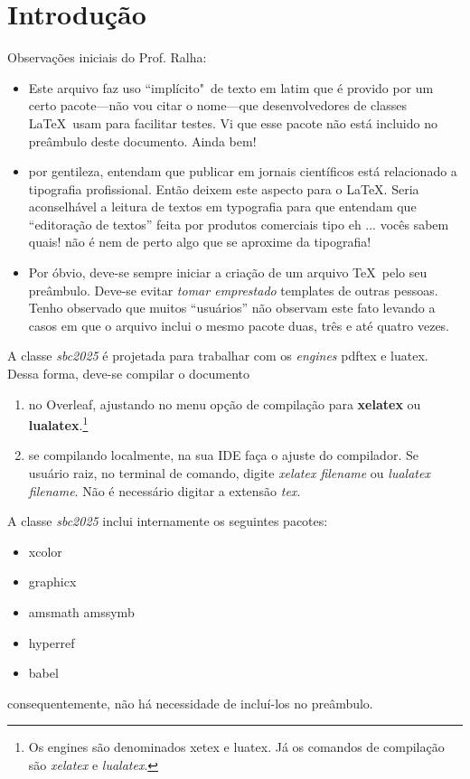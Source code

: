 \documentclass[spanish]{sbc2025}%
\begin{document}
\section{Introdução}
\label{sec:intro}

Observações iniciais do Prof. Ralha:
\begin{itemize}
    \item Este arquivo faz uso ``implícito"\ de texto em latim que é provido por um certo pacote---não vou citar o nome---que desenvolvedores de classes \LaTeX\ usam para facilitar testes. Vi que esse pacote não está incluido no preâmbulo deste documento. Ainda bem!
    \item por gentileza, entendam que publicar em jornais científicos está relacionado a tipografia profissional. Então deixem este aspecto para o \LaTeX. Seria aconselhável a leitura de textos em typografia para que entendam que ``editoração de textos'' feita por produtos comerciais tipo eh ... vocês sabem quais! não é nem de perto algo que se aproxime da tipografia!
    \item Por óbvio, deve-se sempre iniciar a criação de um arquivo \TeX\ pelo seu preâmbulo. Deve-se evitar \textit{tomar emprestado} templates de outras pessoas. Tenho observado que muitos ``usuários'' não observam este fato levando a casos em que o arquivo inclui o mesmo pacote duas, três e até quatro vezes.
\end{itemize}

A classe \textsl{sbc2025} é projetada para trabalhar com os \textit{engines} pdftex e luatex. Dessa forma, deve-se compilar o documento 
\begin{enumerate}
    \item no Overleaf, ajustando no menu opção de compilação para \textbf{xelatex} ou \textbf{lualatex}.\footnote{Os engines são denominados xetex e luatex. Já os comandos de compilação são \textsl{xelatex} e \textsl{lualatex}.}
    \item se compilando localmente, na sua IDE faça o ajuste do compilador. Se usuário raiz, no terminal de comando, digite \textsl{xelatex filename} ou \textsl{lualatex filename}. Não é necessário digitar a extensão \textsl{tex}.
\end{enumerate}

A classe \textsl{sbc2025} inclui internamente os seguintes pacotes:
\begin{itemize}
    \item xcolor
    \item graphicx
    \item amsmath amssymb
    \item hyperref
    \item babel
\end{itemize}
\noindent consequentemente, não há necessidade de incluí-los no preâmbulo.
\end{document}
